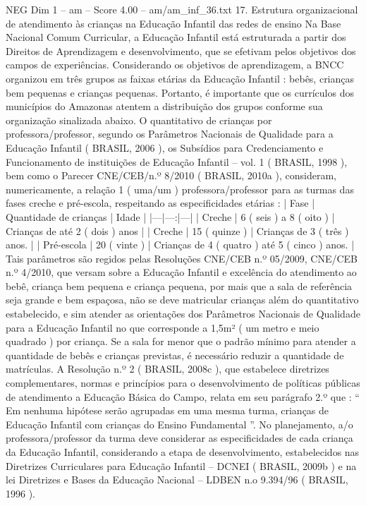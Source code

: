 \begin{textsample}{NEG Dim 1 – am – Score 4.00 – am/am\_inf\_36.txt}  \label{ex:f1_neg_070}
17.
Estrutura organizacional de atendimento às crianças na Educação Infantil das redes de ensino Na Base Nacional Comum Curricular, a Educação Infantil está estruturada a partir dos Direitos de Aprendizagem e desenvolvimento, que se efetivam pelos objetivos dos campos de experiências.
Considerando os objetivos de aprendizagem, a BNCC organizou em três grupos as faixas etárias da Educação Infantil : bebês, crianças bem pequenas e crianças pequenas.
Portanto, é importante que os currículos dos municípios do Amazonas atentem a distribuição dos grupos conforme sua organização sinalizada abaixo.
O quantitativo de crianças por professora/professor, segundo os Parâmetros Nacionais de Qualidade para a Educação Infantil ( BRASIL, 2006 ), os Subsídios para Credenciamento e Funcionamento de instituições de Educação Infantil – vol. 1 ( BRASIL, 1998 ), bem como o Parecer CNE/CEB/n.º 8/2010 ( BRASIL, 2010a ), consideram, numericamente, a relação 1 ( uma/um ) professora/professor para as turmas das fases creche e pré-escola, respeitando as especificidades etárias : | Fase | Quantidade de crianças | Idade | |---|---:|---| | Creche | 6 ( seis ) a 8 ( oito ) | Crianças de até 2 ( dois ) anos | | Creche | 15 ( quinze ) | Crianças de 3 ( três ) anos. | | Pré-escola | 20 ( vinte ) | Crianças de 4 ( quatro ) até 5 ( cinco ) anos. | Tais parâmetros são regidos pelas Resoluções CNE/CEB n.º 05/2009, CNE/CEB n.º 4/2010, que versam sobre a Educação Infantil e excelência do atendimento ao bebê, criança bem pequena e criança pequena, por mais que a sala de referência seja grande e bem espaçosa, não se deve matricular crianças além do quantitativo estabelecido, e sim atender as orientações dos Parâmetros Nacionais de Qualidade para a Educação Infantil no que corresponde a 1,5m² ( um metro e meio quadrado ) por criança.
Se a sala for menor que o padrão mínimo para atender a quantidade de bebês e crianças previstas, é necessário reduzir a quantidade de matrículas.
A Resolução n.º 2 ( BRASIL, 2008c ), que estabelece diretrizes complementares, normas e princípios para o desenvolvimento de políticas públicas de atendimento a Educação Básica do Campo, relata em seu parágrafo 2.º que : “ Em nenhuma hipótese serão agrupadas em uma mesma turma, crianças de Educação Infantil com crianças do Ensino Fundamental ”.
No planejamento, a/o professora/professor da turma deve considerar as especificidades de cada criança da Educação Infantil, considerando a etapa de desenvolvimento, estabelecidos nas Diretrizes Curriculares para Educação Infantil – DCNEI ( BRASIL, 2009b ) e na lei Diretrizes e Bases da Educação Nacional – LDBEN n.o 9.394/96 ( BRASIL, 1996 ).

\end{textsample}

